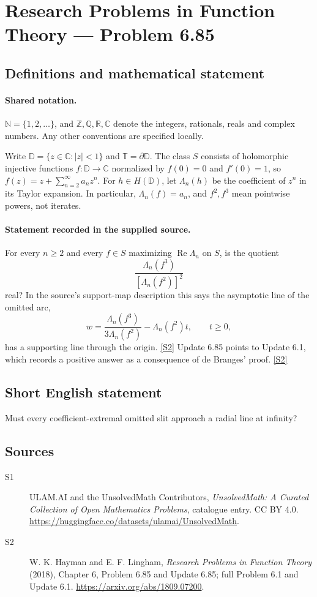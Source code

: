 \documentclass[11pt]{article}
\newcommand{\sref}[2]{\hyperlink{source:#1:#2}{[S#2]}}
\begin{document}
\section{Research Problems in Function Theory — Problem 6.85}\label{statement}

\subsection{Definitions and mathematical statement}

\paragraph{Shared notation.}$\mathbb N=\{1,2,\ldots\}$, and $\mathbb Z,\mathbb Q,\mathbb R,\mathbb C$ denote the integers, rationals, reals and complex numbers. Any other conventions are specified locally.


Write $\mathbb D=\{z\in\mathbb C:|z|<1\}$ and $\mathbb T=\partial\mathbb D$. The class $S$ consists of holomorphic injective functions $f:\mathbb D\to\mathbb C$ normalized by $f(0)=0$ and $f'(0)=1$, so $f(z)=z+\sum_{n=2}^{\infty}a_nz^n$. For $h\in H(\mathbb D)$, let $\Lambda_n(h)$ be the coefficient of $z^n$ in its Taylor expansion. In particular, $\Lambda_n(f)=a_n$, and $f^2,f^3$ mean pointwise powers, not iterates.
\paragraph{Statement recorded in the supplied source.}
For every $n\ge2$ and every $f\in S$ maximizing $\operatorname{Re}\Lambda_n$ on $S$, is the quotient \[\frac{\Lambda_n(f^3)}{[\Lambda_n(f^2)]^2}\] real? In the source's support-map description this says the asymptotic line of the omitted arc, \[w=\frac{\Lambda_n(f^3)}{3\Lambda_n(f^2)}-\Lambda_n(f^2)t,\qquad t\ge0,\] has a supporting line through the origin. \sref{statement}{2}
Update 6.85 points to Update 6.1, which records a positive answer as a consequence of de Branges' proof. \sref{statement}{2}
\subsection{Short English statement}
Must every coefficient-extremal omitted slit approach a radial line at infinity?
\subsection{Sources}
\begin{description}
\item[\hypertarget{source:statement:1}{S1}] ULAM.AI and the UnsolvedMath Contributors, \emph{UnsolvedMath: A Curated Collection of Open Mathematics Problems}, catalogue entry. CC BY 4.0. \url{https://huggingface.co/datasets/ulamai/UnsolvedMath}.
\item[\hypertarget{source:statement:2}{S2}] W. K. Hayman and E. F. Lingham, \emph{Research Problems in Function Theory} (2018), Chapter 6, Problem 6.85 and Update 6.85; full Problem 6.1 and Update 6.1. \url{https://arxiv.org/abs/1809.07200}.
\end{description}
\label{end:statement}
\end{document}
